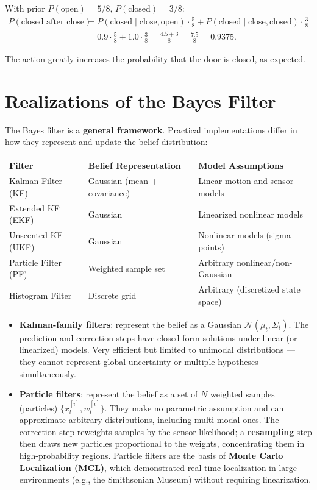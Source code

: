 \documentclass[11pt,a4paper]{article}
\theoremstyle{definition}
\theoremstyle{plain}
\theoremstyle{remark}
\begin{document}
With prior $P(\text{open}) = 5/8$, $P(\text{closed}) = 3/8$:
\begin{align*}
P(\text{closed after close}) &= P(\text{closed} \mid \text{close}, \text{open}) \cdot \tfrac{5}{8} + P(\text{closed} \mid \text{close}, \text{closed}) \cdot \tfrac{3}{8} \\
&= 0.9 \cdot \tfrac{5}{8} + 1.0 \cdot \tfrac{3}{8} = \tfrac{4.5 + 3}{8} = \tfrac{7.5}{8} = 0.9375.
\end{align*}

The action greatly increases the probability that the door is closed, as expected.

\section{Realizations of the Bayes Filter}

The Bayes filter is a \textbf{general framework}. Practical implementations differ in how they represent and update the belief distribution:

\begin{center}
\begin{tabular}{lll}
\hline
\textbf{Filter} & \textbf{Belief Representation} & \textbf{Model Assumptions} \\
\hline
Kalman Filter (KF) & Gaussian (mean + covariance) & Linear motion and sensor models \\
Extended KF (EKF) & Gaussian & Linearized nonlinear models \\
Unscented KF (UKF) & Gaussian & Nonlinear models (sigma points) \\
Particle Filter (PF) & Weighted sample set & Arbitrary nonlinear/non-Gaussian \\
Histogram Filter & Discrete grid & Arbitrary (discretized state space) \\
\hline
\end{tabular}
\end{center}

\begin{itemize}
    \item \textbf{Kalman-family filters}: represent the belief as a Gaussian $\mathcal{N}(\mu_t, \Sigma_t)$. The prediction and correction steps have closed-form solutions under linear (or linearized) models. Very efficient but limited to unimodal distributions — they cannot represent global uncertainty or multiple hypotheses simultaneously.
    \item \textbf{Particle filters}: represent the belief as a set of $N$ weighted samples (particles) $\{x_t^{[i]}, w_t^{[i]}\}$. They make no parametric assumption and can approximate arbitrary distributions, including multi-modal ones. The correction step reweights samples by the sensor likelihood; a \textbf{resampling} step then draws new particles proportional to the weights, concentrating them in high-probability regions. Particle filters are the basis of \textbf{Monte Carlo Localization (MCL)}, which demonstrated real-time localization in large environments (e.g., the Smithsonian Museum) without requiring linearization.
\end{itemize}
\end{document}
